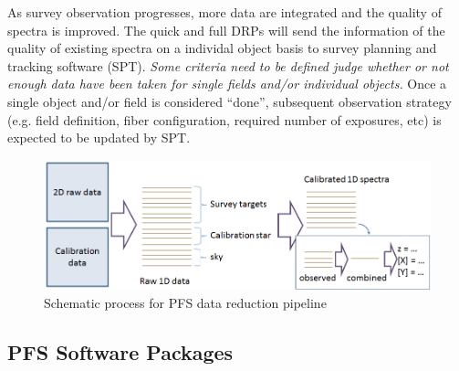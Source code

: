 \documentclass[a4paper,notitlepage]{article}
\begin{document}
As survey observation progresses, more data are integrated and the
quality of spectra is improved. The quick and full DRPs will send the
information of the quality of existing spectra on a individal object
basis to survey planning and tracking software (SPT). {\it Some criteria
need to be defined judge whether or not enough data have been taken for
single fields and/or individual objects.} Once a single object and/or
field is considered ``done'', subsequent observation strategy
(e.g. field definition, fiber configuration, required number of
exposures, etc) is expected to be updated by SPT.

\begin{figure}[htb]
  \begin{center}
    \includegraphics[width=.75\linewidth]{sciops-scireq-drp-slide.png}
  \end{center}
  \caption{Schematic process for PFS data reduction pipeline}
  \label{fig:sciops-scireq-drp-slide}
\end{figure}

\subsection{PFS Software Packages}
\end{document}
